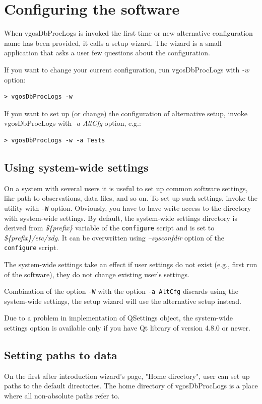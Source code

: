 \documentclass [10pt,letterpaper]{report}
\begin{document}
%
%
\chapter{Configuring the software}
When vgosDbProcLogs is invoked the first time or new alternative
configuration name has been provided, it calls a setup wizard. The
wizard is a small application that asks a user few questions about the
configuration.

If you want to change your current configuration, run vgosDbProcLogs with
{\sl -w} option:
\begin{verbatim}
> vgosDbProcLogs -w
\end{verbatim}
\noindent
If you want to set up (or change) the configuration of alternative setup,
invoke vgosDbProcLogs with {\sl -a AltCfg} option, e.g.:
\begin{verbatim}
> vgosDbProcLogs -w -a Tests
\end{verbatim}



\section{Using system-wide settings}
\label{sect_systemwide_settings}
On a system with several users it is useful to set up common software settings,
like path to observations, data files, and so on. To set up such settings, invoke
the utility with {\tt -W} option. Obviously, you have to have write access to the
directory with system-wide settings. By default, the system-wide settings directory
is derived from {\sl \$\{prefix\}} variable of the {\tt configure} script and is
set to {\sl \$\{prefix\}/etc/xdg}. It can be overwritten using {\sl --sysconfdir}
option of the {\tt configure} script.

The system-wide settings take an effect if user settings do not exist (e.g., first
run of the software), they do not change existing user's settings.

Combination of the option {\tt -W} with the option {\tt -a AltCfg} discards
using the system-wide settings, the setup wizard will use the alternative setup
instead.

Due to a problem in implementation of QSettings object, the system-wide settings
option is available only if you have Qt library of version 4.8.0 or newer.



\section{Setting paths to data}
\label{config_paths}
On the first after introduction wizard's page, "Home directory", user can
set up paths to the default directories. The home directory of vgosDbProcLogs
is a place where all non-absolute paths refer to.
\end{document}
